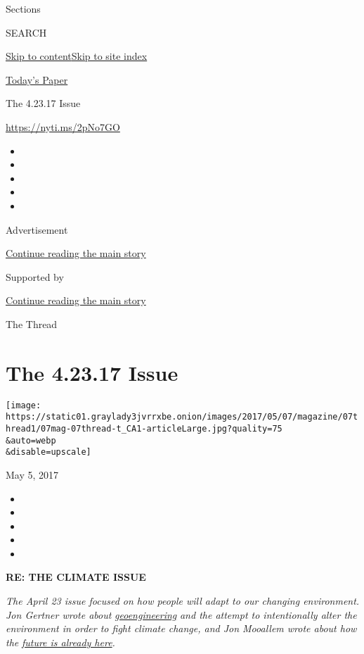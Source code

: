 Sections

SEARCH

\protect\hyperlink{site-content}{Skip to
content}\protect\hyperlink{site-index}{Skip to site index}

\href{https://myaccount.nytimes3xbfgragh.onion/auth/login?response_type=cookie\&client_id=vi}{}

\href{https://www.nytimes3xbfgragh.onion/section/todayspaper}{Today's
Paper}

The 4.23.17 Issue

\url{https://nyti.ms/2pNo7GO}

\begin{itemize}
\item
\item
\item
\item
\item
\end{itemize}

Advertisement

\protect\hyperlink{after-top}{Continue reading the main story}

Supported by

\protect\hyperlink{after-sponsor}{Continue reading the main story}

The Thread

\hypertarget{the-42317-issue}{%
\section{The 4.23.17 Issue}\label{the-42317-issue}}

\texttt{[image: https://static01.graylady3jvrrxbe.onion/images/2017/05/07/magazine/07thread1/07mag-07thread-t\_CA1-articleLarge.jpg?quality=75\\\&auto=webp\\\&disable=upscale]}

May 5, 2017

\begin{itemize}
\item
\item
\item
\item
\item
\end{itemize}

\textbf{RE: THE CLIMATE ISSUE}

\emph{The April 23 issue focused on how people will adapt to our
changing environment. Jon Gertner wrote about}
\href{https://www.nytimes3xbfgragh.onion/2017/04/18/magazine/is-it-ok-to-engineer-the-environment-to-fight-climate-change.html}{\emph{geoengineering}}
\emph{and the attempt to intentionally alter the environment in order to
fight climate change, and Jon Mooallem wrote about how the}
\href{https://www.nytimes3xbfgragh.onion/2017/04/19/magazine/our-climate-future-is-actually-our-climate-present.html}{\emph{future
is already here}}\emph{.}

